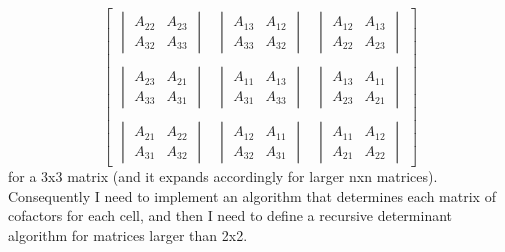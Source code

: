 \documentclass[12pt]{article}
\begin{document}
\begin{equation}
\begin{bmatrix}
\begin{vmatrix}
A_{22} & A_{23} \\
A_{32} & A_{33}
\end{vmatrix}
&
\begin{vmatrix}
A_{13} & A_{12} \\
A_{33} & A_{32}
\end{vmatrix}
&
\begin{vmatrix}
A_{12} & A_{13} \\
A_{22} & A_{23}
\end{vmatrix} \\ \\
\begin{vmatrix}
A_{23} & A_{21} \\
A_{33} & A_{31}
\end{vmatrix}
&
\begin{vmatrix}
A_{11} & A_{13} \\
A_{31} & A_{33}
\end{vmatrix}
&
\begin{vmatrix}
A_{13} & A_{11} \\
A_{23} & A_{21}
\end{vmatrix} \\ \\
\begin{vmatrix}
A_{21} & A_{22} \\
A_{31} & A_{32}
\end{vmatrix}
&
\begin{vmatrix}
A_{12} & A_{11} \\
A_{32} & A_{31}
\end{vmatrix}
&
\begin{vmatrix}
A_{11} & A_{12} \\
A_{21} & A_{22}
\end{vmatrix}
\end{bmatrix}
\end{equation}
for a 3x3 matrix (and it expands accordingly for larger nxn matrices). Consequently I need to implement an algorithm that determines each matrix of cofactors for each cell, and then I need to define a recursive determinant algorithm for matrices larger than 2x2.
\end{document}
